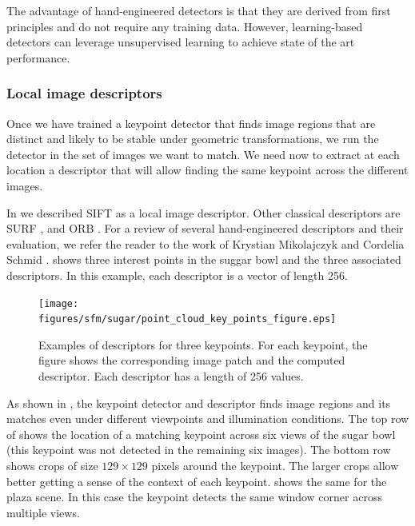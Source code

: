 The advantage of hand-engineered detectors is that they are derived from first principles and do not require any training data. However, learning-based detectors can leverage unsupervised learning to achieve state of the art performance.




\subsubsection{Local image descriptors}

Once we have trained a keypoint detector that finds image regions that are distinct and likely to be stable under geometric transformations, we run the detector in the set of images we want to match. We need now to extract at each location a descriptor that will allow finding the same keypoint across the different images. 

In \chap{\ref{chap:stereo_vision}} we described SIFT  \cite{Lowe04} as a local image descriptor. Other classical descriptors are SURF \cite{Bay2008346}, and ORB \cite{Rublee2011}.
For a review of several hand-engineered descriptors and their evaluation, we refer the reader to the work of Krystian Mikolajczyk and Cordelia Schmid \cite{Mikolajczyk2005}.
\Fig{\ref{fig:sfm:descriptors_sugar}} shows three interest points in the suggar bowl and the three associated descriptors. In this example, each descriptor is a vector of length 256.


\begin{figure}[t]
    \centerline{
        \texttt{[image: figures/sfm/sugar/point\_cloud\_key\_points\_figure.eps]}
    }
    \caption{Examples of descriptors for three keypoints. For each keypoint, the figure shows the corresponding image patch and the computed descriptor. Each descriptor has a length of 256 values.}
    \label{fig:sfm:descriptors_sugar}
\end{figure}

As shown in \fig{\ref{fig:sfm:palma_keypoint_matching_figure}}, the keypoint detector and descriptor finds image regions and its matches even under different viewpoints and illumination conditions.
The top row of  shows the location of a matching keypoint across six views of the sugar bowl (this keypoint was not detected in the remaining six images). The bottom row shows crops of size $129 \times 129$ pixels around the keypoint. The larger crops allow better getting a sense of the context of each keypoint.
 shows the same for the plaza scene. In this case the keypoint detects the same window corner across multiple views.


